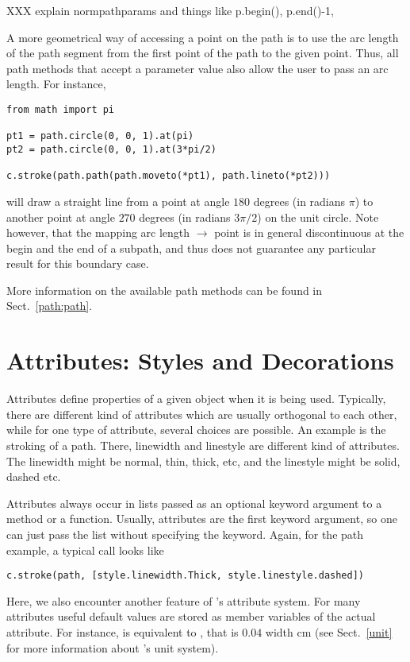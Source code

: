 XXX explain normpathparams and things like p.begin(), p.end()-1,

A more geometrical way of accessing a point on the path is to use the
arc length of the path segment from the first point of the path to the
given point. Thus, all \PyX{} path methods that accept a parameter
value also allow the user to pass an arc length. For instance,
\begin{verbatim}
from math import pi

pt1 = path.circle(0, 0, 1).at(pi)
pt2 = path.circle(0, 0, 1).at(3*pi/2)

c.stroke(path.path(path.moveto(*pt1), path.lineto(*pt2)))
\end{verbatim}
will draw a straight line from a point at angle $180$ degrees (in
radians $\pi$) to another point at angle $270$ degrees (in radians
$3\pi/2$) on the unit circle. Note however, that the mapping arc
length $\to$ point is in general discontinuous at the begin and the
end of a subpath, and thus \PyX{} does not guarantee any particular
result for this boundary case.

More information on the available path methods can be found 
in Sect.~\ref{path:path}. 

\section{Attributes: Styles and Decorations}

Attributes define properties of a given object when it is being used.
Typically, there are different kind of attributes which are usually
orthogonal to each other, while for one type of attribute, several
choices are possible. An example is the stroking of a path. There,
linewidth and linestyle are different kind of attributes. The linewidth
might be normal, thin, thick, etc, and the linestyle might be solid,
dashed etc.

Attributes always occur in lists passed as an optional keyword argument
to a method or a function. Usually, attributes are the first keyword
argument, so one can just pass the list without specifying the keyword.
Again, for the path example, a typical call looks like

\begin{verbatim}
c.stroke(path, [style.linewidth.Thick, style.linestyle.dashed])
\end{verbatim}

Here, we also encounter another feature of \PyX's attribute system. For
many attributes useful default values are stored as member variables of
the actual attribute. For instance,  is
equivalent to , that is
$0.04$ width cm (see Sect.~\ref{unit} for more information about
\PyX's unit system). 

